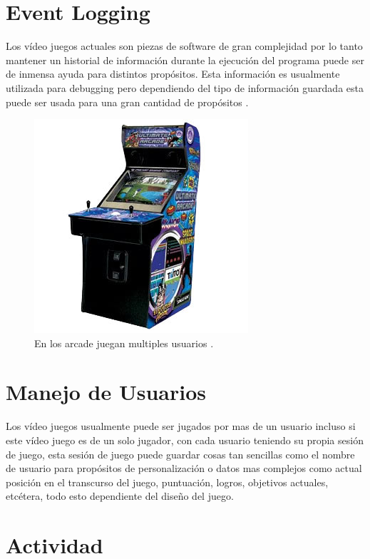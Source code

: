 \section{Event Logging}
Los vídeo juegos actuales son piezas de software de gran complejidad por lo tanto mantener un historial de información durante la ejecución del programa puede ser de inmensa ayuda para distintos propósitos. Esta información es usualmente utilizada para debugging pero dependiendo del tipo de información guardada esta puede ser usada para una gran cantidad de propósitos \cite{colm_tracing}.
\newpage
\setlength\intextsep{0pt}
\begin{figure}
\includegraphics[width=\linewidth]{media/arcade-machines.jpg}
\caption{En los arcade juegan multiples usuarios \cite{arcade_score}.}
\label{fig:arcade}
\end{figure}
\section{Manejo de Usuarios}
Los vídeo juegos usualmente puede ser jugados por mas de un usuario incluso si este vídeo juego es de un solo jugador, con cada usuario teniendo su propia sesión de juego, esta sesión de juego puede guardar cosas tan sencillas como el nombre de usuario para propósitos de personalización o datos mas complejos como actual posición en el transcurso del juego, puntuación, logros, objetivos actuales, etcétera, todo esto dependiente del diseño del juego.

\section{Actividad}
